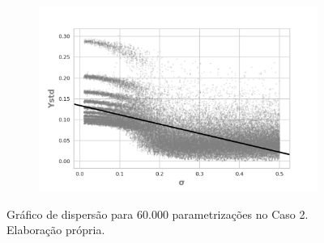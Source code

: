 \begin{figure}[H]
                \begin{subfigure}[b]{0.49\textwidth}
            \includegraphics[width=\textwidth]{ims/sigmaregression/sigmasigma.png}
    \end{subfigure}
    \caption{Gráfico de dispersão para 60.000 parametrizações no Caso 2.
      Elaboração própria.}\label{fig:scatter1}
\end{figure}


